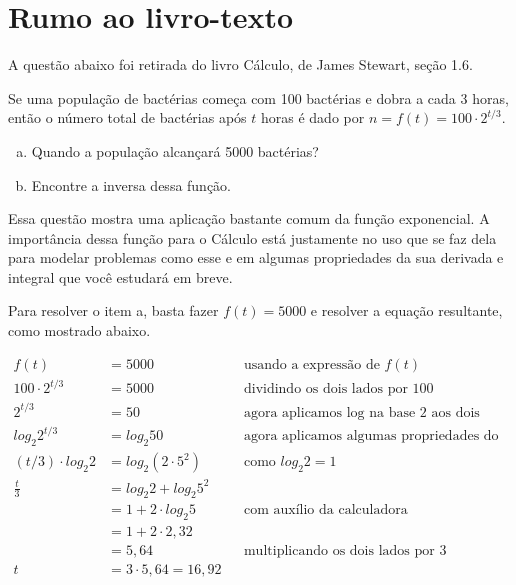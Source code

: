 \documentclass[main_estudante.tex]{subfiles}
\begin{document}
\newpage

\section{Rumo ao livro-texto}

A questão abaixo foi retirada do livro Cálculo, de James Stewart, seção 1.6.

\begin{resolvida}
Se uma população de bactérias começa com 100 bactérias e dobra a cada 3 horas, então o número total de bactérias após $t$ horas é dado por $n= f(t) = 100 \cdot 2^{t/3}$.
\begin{enumerate}[a)]
 \item Quando a população alcançará 5000 bactérias?
 \item Encontre a inversa dessa função.
\end{enumerate}
\end{resolvida}

Essa questão mostra uma aplicação bastante comum da função exponencial. A importância dessa função para o Cálculo está justamente no uso que se faz dela para modelar problemas como esse e em algumas propriedades da sua derivada e integral que você estudará em breve.

Para resolver o item a, basta fazer $f(t)=5000$ e resolver a equação resultante, como mostrado abaixo.

\begin{align*}
f(t) & {} =5000 && \text{usando a expressão de } f(t)\\
100 \cdot 2^{t/3} & {} = 5000  && \text{dividindo os dois lados por 100}\\
2^{t/3} & {} = 50 && \text{agora aplicamos log na base 2 aos dois lados da igualdade} \\
log_2 2^{t/3} & {} = log_2 50 && \text{agora aplicamos algumas propriedades do log} \\
(t/3) \cdot log_2 2 & {} = log_2 (2 \cdot 5^2)  && \text{como } log_2 2=1\\
 \frac{t}{3} & = log_2 2 + log_2 5^2 \\
 & = 1 + 2 \cdot log_2 5 && \text{com auxílio da calculadora} \\
 & = 1 + 2 \cdot 2,32 \\
 & = 5,64 && \text{multiplicando os dois lados por 3}\\
t & {} = 3 \cdot 5,64 = 16,92 \\
\end{align*}
\end{document}
